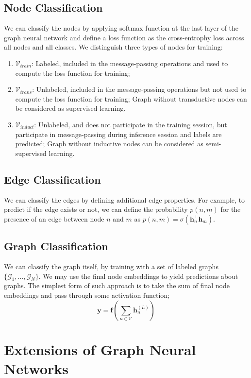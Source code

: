\documentclass{article}
\begin{document}
    \subsection{Node Classification}
        We can classify the nodes by applying softmax function at the last layer of the graph neural network and define a loss function as the cross-entrophy loss across all nodes and all classes.
        We distinguish three types of nodes for training:
        \begin{enumerate}
            \item $\mathcal V_{train}$: Labeled, included in the message-passing operations and used to compute the loss function for training;
            \item $\mathcal V_{trans}$: Unlabeled, included in the message-passing operations but not used to compute the loss function for training; Graph without transductive nodes can be considered as supervised learning.
            \item $\mathcal V_{induct}$: Unlabeled, and does not participate in the training session, but participate in message-passing during inference session and labels are predicted; Graph without inductive nodes can be considered as semi-supervised learning.
        \end{enumerate}
    \subsection{Edge Classification}
        We can classify the edges by defining additional edge properties. For example, to predict if the edge exists or not, we can
        define the probability $p(n,m)$ for the presence of an edge between node $n$ and $m$ as $p(n,m)=\sigma(\textbf{h}_n^{\top}\textbf{h}_m)$.
    \subsection{Graph Classification}
        We can classify the graph itself, by training with a set of labeled graphs $\{\mathcal G_1, \dots,\mathcal G_N\}$. We may use
        the final node embeddings to yield predictions about graphs. The simplest form of such approach is to take the sum of final node embeddings and pass through some activation function;
        \[
        \textbf{y}=\textbf{f}\left(\sum_{n \in \mathcal V}\textbf{h}_n^{(L)}\right)
        \]

\section{Extensions of Graph Neural Networks}
\end{document}
